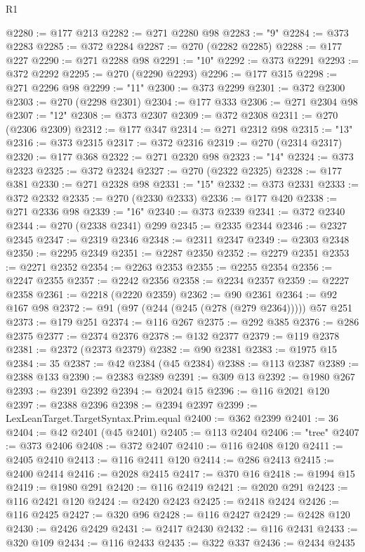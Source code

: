 \begin{lexlean}{R1}
\begin{coremodule}
@2280 := @177 @213
@2282 := @271 @2280 @98
@2283 := "9"
@2284 := @373 @2283
@2285 := @372 @2284
@2287 := @270 (@2282 @2285)
@2288 := @177 @227
@2290 := @271 @2288 @98
@2291 := "10"
@2292 := @373 @2291
@2293 := @372 @2292
@2295 := @270 (@2290 @2293)
@2296 := @177 @315
@2298 := @271 @2296 @98
@2299 := "11"
@2300 := @373 @2299
@2301 := @372 @2300
@2303 := @270 (@2298 @2301)
@2304 := @177 @333
@2306 := @271 @2304 @98
@2307 := "12"
@2308 := @373 @2307
@2309 := @372 @2308
@2311 := @270 (@2306 @2309)
@2312 := @177 @347
@2314 := @271 @2312 @98
@2315 := "13"
@2316 := @373 @2315
@2317 := @372 @2316
@2319 := @270 (@2314 @2317)
@2320 := @177 @368
@2322 := @271 @2320 @98
@2323 := "14"
@2324 := @373 @2323
@2325 := @372 @2324
@2327 := @270 (@2322 @2325)
@2328 := @177 @381
@2330 := @271 @2328 @98
@2331 := "15"
@2332 := @373 @2331
@2333 := @372 @2332
@2335 := @270 (@2330 @2333)
@2336 := @177 @420
@2338 := @271 @2336 @98
@2339 := "16"
@2340 := @373 @2339
@2341 := @372 @2340
@2344 := @270 (@2338 @2341) @299
@2345 := @2335 @2344
@2346 := @2327 @2345
@2347 := @2319 @2346
@2348 := @2311 @2347
@2349 := @2303 @2348
@2350 := @2295 @2349
@2351 := @2287 @2350
@2352 := @2279 @2351
@2353 := @2271 @2352
@2354 := @2263 @2353
@2355 := @2255 @2354
@2356 := @2247 @2355
@2357 := @2242 @2356
@2358 := @2234 @2357
@2359 := @2227 @2358
@2361 := @2218 (@2220 @2359)
@2362 := @90 @2361
@2364 := @92 @167 @98
@2372 := @91 (@97 (@244 (@245 (@278 (@279 @2364))))) @57 @251
@2373 := @179 @251
@2374 := @116 @267
@2375 := @292 @385
@2376 := @286 @2375
@2377 := @2374 @2376
@2378 := @132 @2377
@2379 := @119 @2378
@2381 := @2372 (@2373 @2379)
@2382 := @90 @2381
@2383 := @1975 @15
@2384 := 35
@2387 := @42 @2384 (@45 @2384)
@2388 := @113 @2387
@2389 := @2388 @133
@2390 := @2383 @2389
@2391 := @309 @13
@2392 := @1980 @267
@2393 := @2391 @2392
@2394 := @2024 @15
@2396 := @116 @2021 @120
@2397 := @2388 @2396
@2398 := @2394 @2397
@2399 := LexLeanTarget.TargetSyntax.Prim.equal
@2400 := @362 @2399
@2401 := 36
@2404 := @42 @2401 (@45 @2401)
@2405 := @113 @2404
@2406 := "tree"
@2407 := @373 @2406
@2408 := @372 @2407
@2410 := @116 @2408 @120
@2411 := @2405 @2410
@2413 := @116 @2411 @120
@2414 := @286 @2413
@2415 := @2400 @2414
@2416 := @2028 @2415
@2417 := @370 @16
@2418 := @1994 @15
@2419 := @1980 @291
@2420 := @116 @2419
@2421 := @2020 @291
@2423 := @116 @2421 @120
@2424 := @2420 @2423
@2425 := @2418 @2424
@2426 := @116 @2425
@2427 := @320 @96
@2428 := @116 @2427
@2429 := @2428 @120
@2430 := @2426 @2429
@2431 := @2417 @2430
@2432 := @116 @2431
@2433 := @320 @109
@2434 := @116 @2433
@2435 := @322 @337
@2436 := @2434 @2435

\end{coremodule}
\end{lexlean}
